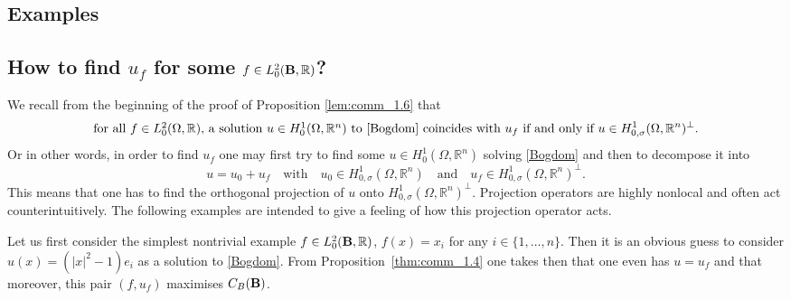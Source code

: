 \documentclass[11pt]{article}
\theoremstyle{plain}
\theoremstyle{definition}
\numberwithin{equation}{section}
\newcommand{\R}{\mathbb{R}}
\newcommand{\B}{{\bf B}}
\begin{document}
\begin{appendix}
	
\section{Examples}\label{sec:examples}

\subsection{How to find $u_f$ for some $f\in L^2_0(\B,\R)$?}\label{howto}

We recall from the beginning of the proof of Proposition \ref{lem:comm_1.6} that
$$
\mbox{for all $f\in L^2_0 (\Omega,\R)$, a solution $u\in H^1_{0}(\Omega,\R^n)$ to \eqref{Bogdom} coincides with $u_f$ if and only if }
u\in H^1_{0,\sigma}(\Omega,\R^n)^\perp.
$$
Or in other words, in order to find $u_f$ one may first try to find some $u\in H^1_{0}(\Omega,\R^n)$ solving \eqref{Bogdom} and then to decompose it into
$$
u=u_0+u_f \quad \mbox{with}\quad  u_0\in H^1_{0,\sigma}(\Omega,\R^n) \quad \mbox{and}\quad  u_f \in H^1_{0,\sigma}(\Omega,\R^n)^\perp.
$$
This means that one has to find the orthogonal projection of $u$ onto $H^1_{0,\sigma}(\Omega,\R^n)^\perp$.
Projection operators are highly nonlocal and often act counterintuitively. The following examples are intended to give a feeling of how this projection operator acts.


Let us first consider the simplest nontrivial example $f\in L^2_0(\B,\R)$, $f(x)=x_i$ for any $i\in \{1,\ldots,n\}$. Then it is an obvious guess to consider $u(x)=(|x|^2-1)e_i $ as a solution to \eqref{Bogdom}. From Proposition~\ref{thm:comm_1.4} one takes then that one even has $u=u_f$ and that moreover, this pair $(f,u_f)$ maximises $C_B(\B)$.



\end{appendix}
\end{document}
